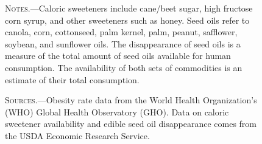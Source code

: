 \documentclass[12pt]{article}
\begin{document}
\begin{figure}[ht]
    \begin{minipage}{\textwidth}
    \bigskip
    
    \footnotesize
    \textsc{Notes.}---Caloric sweeteners include cane/beet sugar, high fructose corn syrup, and other sweeteners such as honey. Seed oils refer to canola, corn, cottonseed, palm kernel, palm, peanut, safflower, soybean, and sunflower oils. The disappearance of seed oils is a measure of the total amount of seed oils available for human consumption. The availability of both sets of commodities is an estimate of their total consumption.
    
    \bigskip
    \textsc{Sources.}---Obesity rate data from the World Health Organization's (WHO) Global Health Observatory (GHO). Data on caloric sweetener availability and edible seed oil disappearance comes from the USDA Economic Research Service.
    \end{minipage}
\end{figure}
\end{document}
